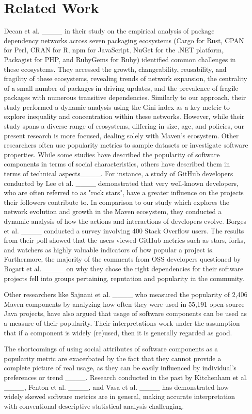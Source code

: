 \section{Related Work}
\label{section:relatedwork}

Decan et al. ____ in their study on the empirical analysis of package dependency networks across seven packaging ecosystems (Cargo for Rust, CPAN for Perl, CRAN for R, npm for JavaScript, NuGet for the .NET platform, Packagist for PHP, and RubyGems for Ruby) identified common challenges in these ecosystems. They accessed the growth, changeability, reusability, and fragility of these ecosystems, revealing trends of network expansion, the centrality of a small number of packages in driving updates, and the prevalence of fragile packages with numerous transitive dependencies. Similarly to our approach, their study performed a dynamic analysis using the Gini index as a key metric to explore inequality and concentration within these networks. However, while their study spans a diverse range of ecosystems, differing in size, age, and policies, our present research is more focused, dealing solely with Maven's ecosystem.
Other researchers often use popularity metrics to sample datasets or investigate software properties. While some studies have described the popularity of software components in terms of social characteristics, others have described them in terms of technical aspects____. For instance, a study of GitHub developers conducted by Lee et al. ____ demonstrated that very well-known developers, who are often referred to as "rock stars", have a greater influence on the projects their followers contribute to. In comparison to our study which explores the network evolution and growth in the Maven ecosystem, they conducted a dynamic analysis of how the actions and interactions of developers evolve.
Borges et al. ____ conducted a survey involving 400 Stack Overflow users. The results from their poll showed that the users viewed GitHub metrics such as stars, forks, and watchers as highly valuable indicators of how popular a project is. Furthermore, the majority of the comments from OSS developers questioned by Bogart et al. ____ on why they chose the right dependencies for their software projects fell into groups pertaining, reputation and popularity in the community. 

Other researchers like Sajnani et al. ____ who measured the popularity of 2,406 Maven components by analyzing how often they were used in 55,191 open-source Java projects, have also argued that usage of software components can be used as a measure of their popularity. Their interpretations work under the assumption that if a component is widely (re)used, then it is generally regarded as good.

The shortcomings of using social attributes of software components as a popularity metric are exacerbated by the fact that they cannot provide a complete picture of real usage, as they can be easily influenced by individual's preferences or trend ____. Research conducted in the past by Kitchenham et al. ____, Fenton et al. ____, and Vasa et al. ____ has demonstrated how widely skewed software metrics are in general, making accurate interpretation with conventional descriptive statistical analysis challenging.